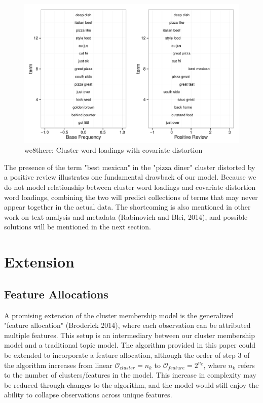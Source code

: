 \documentclass[12pt]{article}
\begin{document}
\begin{figure}[!htpb]
  \centering
\caption[Loadings]{we8there: Cluster word loadings with covariate distortion}
  \includegraphics[width=6.2in]{Images/we8there_distortion.pdf}
\end{figure}

The presence of the term "best mexican" in the "pizza diner" cluster distorted by a positive review illustrates one fundamental drawback of our model. Because we do not model relationship between cluster word loadings and covariate distortion word loadings, combining the two will predict collections of terms that may never appear together in the actual data. The shortcoming is also mentioned in other work on text analysis and metadata (Rabinovich and Blei, 2014), and possible solutions will be mentioned in the next section.


\section{Extension}\label{extensions}

\subsection{Feature Allocations}
A promising extension of the cluster membership model is the generalized "feature allocation" (Broderick 2014), where each observation can be attributed multiple features. This setup is an intermediary between our cluster membership model and a traditional topic model. 
The algorithm provided in this paper could be extended to incorporate a feature allocation, although the order of step 3 of the algorithm increases from linear $\mathcal{O}_{cluster} = n_k$ to $\mathcal{O}_{feature} = 2^{n_k}$, where $n_k$ refers to the number of clusters/features in the model. This increase in complexity may be reduced through changes to the algorithm, and the model would still enjoy the ability to collapse observations across unique features. 
\end{document}
